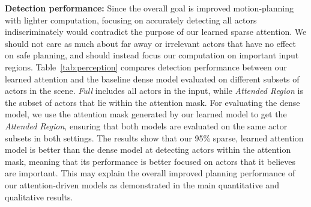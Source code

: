 \textbf{Detection performance:}
Since the overall goal is improved motion-planning with lighter computation, focusing on accurately detecting all actors indiscriminately would contradict the purpose of our learned sparse attention. 
We should not care as much about far away or irrelevant actors that have no effect on safe planning, and should instead focus our computation on important input regions.
Table~\ref{tab:perception} compares detection performance between our learned attention and the baseline dense model evaluated on different subsets of actors in the scene. 
\textit{Full} includes all actors in the input, while 
\textit{Attended Region} is the subset of actors that lie within the attention mask. For evaluating the dense model, we use the attention mask generated by our learned model to get the \textit{Attended Region}, ensuring that both models are evaluated on the same actor subsets in both settings. 
The results show that our 95\% sparse, learned attention model is better than the dense model at detecting actors within the attention mask, meaning that its performance is better focused on actors that it believes are important. 
This may explain the overall improved planning performance of our attention-driven models as demonstrated in the main quantitative and qualitative results.


